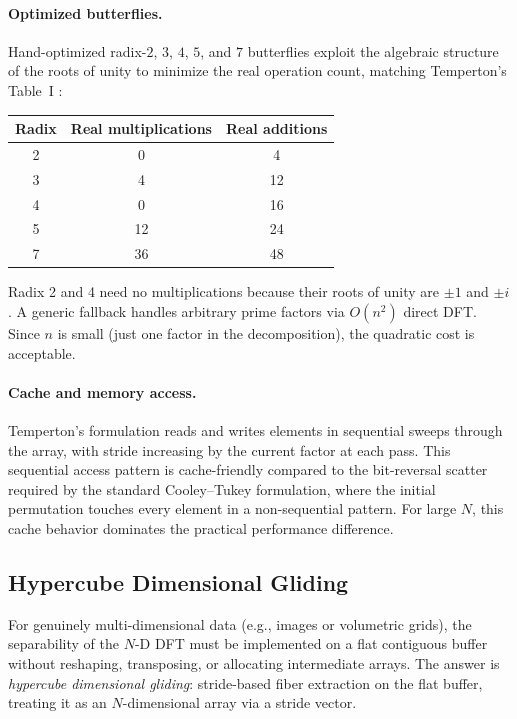 \documentclass[12pt,a4paper]{report}
\theoremstyle{thms}
\theoremstyle{defns}
\begin{document}
\paragraph{Optimized butterflies.} Hand-optimized radix-$2$, $3$, $4$, $5$, and $7$ butterflies exploit the algebraic structure of the roots of unity to minimize the real operation count, matching Temperton's Table~I \cite{temperton_self_sorting}:

\begin{center}
\begin{tabular}{c c c}
    \hline
    Radix & Real multiplications & Real additions \\
    \hline
    2 & 0  & 4  \\
    3 & 4  & 12 \\
    4 & 0  & 16 \\
    5 & 12 & 24 \\
    7 & 36 & 48 \\
    \hline
\end{tabular}
\end{center}

Radix 2 and 4 need no multiplications because their roots of unity are $\pm 1$ and $\pm i$. A generic fallback handles arbitrary prime factors via $O(n^2)$ direct DFT. Since $n$ is small (just one factor in the decomposition), the quadratic cost is acceptable.

\paragraph{Cache and memory access.} Temperton's formulation reads and writes elements in sequential sweeps through the array, with stride increasing by the current factor at each pass. This sequential access pattern is cache-friendly compared to the bit-reversal scatter required by the standard Cooley--Tukey formulation, where the initial permutation touches every element in a non-sequential pattern. For large $N$, this cache behavior dominates the practical performance difference.

\subsection{Hypercube Dimensional Gliding}

For genuinely multi-dimensional data (e.g., images or volumetric grids), the separability of the $N$-D DFT must be implemented on a flat contiguous buffer without reshaping, transposing, or allocating intermediate arrays. The answer is \textit{hypercube dimensional gliding}: stride-based fiber extraction on the flat buffer, treating it as an $N$-dimensional array via a stride vector.
\end{document}
